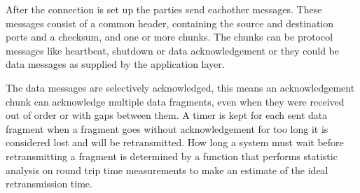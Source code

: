 After the connection is set up the parties send eachother messages. These messages consist of a common header, containing the source and destination ports and a checksum, and one or more chunks. The chunks can be protocol messages like heartbeat, shutdown or data acknowledgement or they could be data messages as supplied by the application layer.

The data messages are selectively acknowledged, this means an acknowledgement chunk can acknowledge multiple data fragments, even when they were received out of order or with gaps between them. A timer is kept for each sent data fragment when a fragment goes without acknowledgement for too long it is considered lost and will be retransmitted. 
How long a system must wait before retransmitting a fragment is determined by a function that performs statistic analysis on round trip time measurements to make an estimate of the ideal retransmission time. 
